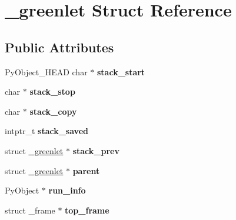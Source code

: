 \hypertarget{struct__greenlet}{}\section{\+\_\+greenlet Struct Reference}
\label{struct__greenlet}
\subsection*{Public Attributes}
\begin{DoxyCompactItemize}
\item 
\mbox{\label{struct__greenlet_a8169f30cb146bb79110945a82f3c0ae9}} 
Py\+Object\+\_\+\+H\+E\+AD char $\ast$ {\bfseries stack\+\_\+start}
\item 
\mbox{\label{struct__greenlet_a21e6653a148b030af6c36ed4ffdc43ae}} 
char $\ast$ {\bfseries stack\+\_\+stop}
\item 
\mbox{\label{struct__greenlet_a3e3be44f86db12f5a32f5f1cf988cde2}} 
char $\ast$ {\bfseries stack\+\_\+copy}
\item 
\mbox{\label{struct__greenlet_a5238f809e54318925b627661cc365038}} 
intptr\+\_\+t {\bfseries stack\+\_\+saved}
\item 
\mbox{\label{struct__greenlet_a0d7e76040e1adbe880c81aa017433b4e}} 
struct \hyperlink{struct__greenlet}{\+\_\+greenlet} $\ast$ {\bfseries stack\+\_\+prev}
\item 
\mbox{\label{struct__greenlet_a5dd9eb33deea20edfb97a6d1c3da0c01}} 
struct \hyperlink{struct__greenlet}{\+\_\+greenlet} $\ast$ {\bfseries parent}
\item 
\mbox{\label{struct__greenlet_af17276f77c1051cdd2bac69e7e32b541}} 
Py\+Object $\ast$ {\bfseries run\+\_\+info}
\item 
\mbox{\label{struct__greenlet_a3a5e7d33104de024f00fa39567ad403c}} 
struct \+\_\+frame $\ast$ {\bfseries top\+\_\+frame}
\item 
\mbox{\label{struct__greenlet_a7171cd9a571977b9d03a59c7656ffe87}} 

\end{DoxyCompactItemize}
